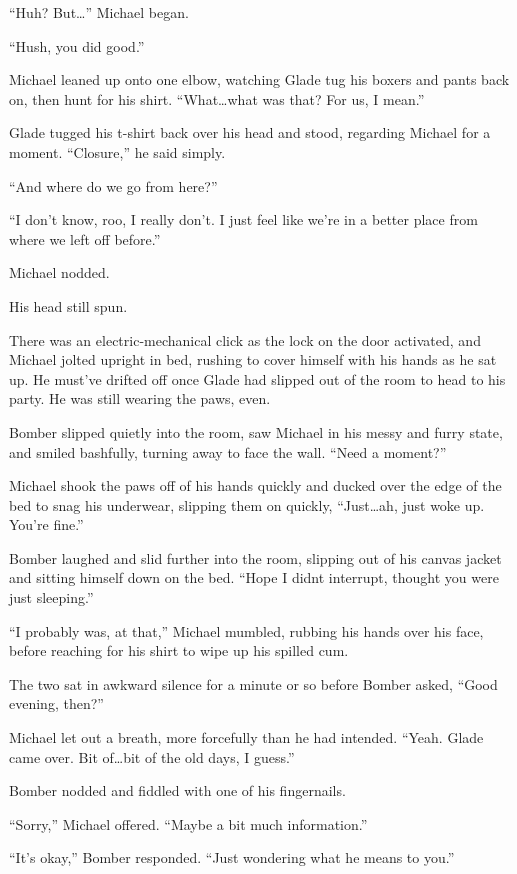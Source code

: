 ``Huh?  But\ldots{}'' Michael began.

``Hush, you did good.''

Michael leaned up onto one elbow, watching Glade tug his boxers and pants back on, then hunt for his shirt.  ``What\ldots{}what was that?  For us, I mean.''

Glade tugged his t-shirt back over his head and stood, regarding Michael for a moment.  ``Closure,'' he said simply.

``And where do we go from here?''

``I don't know, roo, I really don't.  I just feel like we're in a better place from where we left off before.''

Michael nodded.

His head still spun.

\secdiv

There was an electric-mechanical click as the lock on the door activated, and Michael jolted upright in bed, rushing to cover himself with his hands as he sat up.  He must've drifted off once Glade had slipped out of the room to head to his party.  He was still wearing the paws, even.

Bomber slipped quietly into the room, saw Michael in his messy and furry state, and smiled bashfully, turning away to face the wall.  ``Need a moment?''

Michael shook the paws off of his hands quickly and ducked over the edge of the bed to snag his underwear, slipping them on quickly, ``Just\ldots{}ah, just woke up.  You're fine.''

Bomber laughed and slid further into the room, slipping out of his canvas jacket and sitting himself down on the bed.  ``Hope I didnt interrupt, thought you were just sleeping.''

``I probably was, at that,'' Michael mumbled, rubbing his hands over his face, before reaching for his shirt to wipe up his spilled cum.

The two sat in awkward silence for a minute or so before Bomber asked, ``Good evening, then?''

Michael let out a breath, more forcefully than he had intended.  ``Yeah.  Glade came over.  Bit of\ldots{}bit of the old days, I guess.''

Bomber nodded and fiddled with one of his fingernails.

``Sorry,'' Michael offered.  ``Maybe a bit much information.''

``It's okay,'' Bomber responded.  ``Just wondering what he means to you.''

